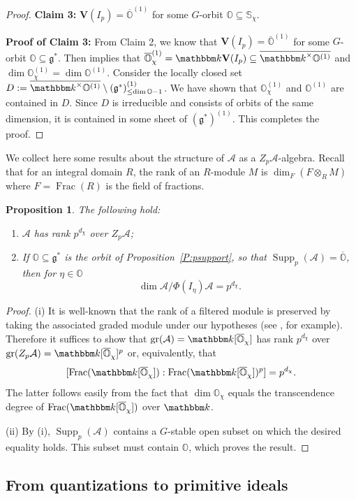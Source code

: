 \documentclass[twoside,12pt,reqno]{amsart}
\newtheorem{Proposition}[Theorem]{Proposition}
\theoremstyle{remark}
\numberwithin{equation}{section}
\def\k{{\mathbbm k}}
\def\gr{\operatorname{gr}}
\def\Fract{\operatorname{Frac}}
\def\Supp{\operatorname{Supp}}
\def\o{\overline}
\def\O{{\mathbb O}}
\def\bbS{\mathbb{S}}
\def\bbV{\mathbf{V}}
\def\g{{\mathfrak g}}
\def\cA{\mathcal{A}}
\newcommand{\A}{\mathcal{A}}
\begin{document}
\begin{proof}
{\bf Claim 3:} $\bbV(I_p)=\o\O^{(1)}$ for some $G$-orbit $\O\subseteq \bbS_\chi$.

{\bf Proof of Claim 3:} From Claim 2, we know that $\bbV(I_p)=\o\O^{(1)}$ for some $G$-orbit $\O\subseteq \g^*$. 
Then \cite[5.3(5)]{PrST} implies that $\o\O_\chi^{(1)}=\k \bbV(I_p)\subseteq \overline{\k^\times\O^{(1)}}$ and $\dim \O_\chi^{(1)} = \dim \O^{(1)}$. Consider the locally closed set $D := \overline{\k^\times \O^{(1)}} \setminus (\g^*)^{(1)}_{\le \dim \O-1}$. 
We have shown that $\O_\chi^{(1)}$ and $\O^{(1)}$ are contained in $D$. Since $D$ is irreducible and consists of orbits of the same dimension, it is contained in some sheet of $(\g^*)^{(1)}$. This completes the proof.
\end{proof}

We collect here some results about the structure of $\cA$ as a $Z_p\A$-algebra. Recall that for an integral domain $R$, the rank of an $R$-module $M$ is $\dim_{F}(F\otimes_R M)$ where $F = \Fract(R)$ is the field of fractions.

\begin{Proposition}
\label{P:fibredimension}
The following hold:
\begin{enumerate}
    \setlength{\itemsep}{4pt}
    \item[(i)] $\A$ has rank $p^{d_\chi}$ over $Z_p\A$;
    \item[(ii)] If $\O \subseteq \g^*$ is the orbit of Proposition~\ref{P:psupport}, so that $\Supp_p(\A) = \o\O$, then for $\eta \in \O$ $$\dim \A/\Phi(I_\eta)\A = p^{d_\chi}.$$
\end{enumerate}
\end{Proposition}
\begin{proof}
    (i) It is well-known that the rank of a filtered module is preserved by taking the associated graded module under our hypotheses (see \cite[Lemma 2.3]{Ti}, for example). Therefore it suffices to show that $\gr(\A)=\k[\o\O_\chi]$ has rank $p^{d_\chi}$ over $\gr(Z_p\A)=\k[\o\O_\chi]^p$ or, equivalently, that $$[\Fract(\k[\o\O_\chi]):\Fract(\k[\o\O_\chi])^p]=p^{d_\chi}.$$ The latter follows easily from the fact that $\dim\O_\chi$ equals the transcendence degree of $\Fract(\k[\o\O_\chi])$ over $\k$.    
    
    (ii) By (i), $\Supp_p(\A)$ contains a $G$-stable open subset on which the desired equality holds. This subset must contain $\O$, which proves the result.
\end{proof}

    
\subsection{From quantizations to primitive ideals}
\label{ss:quantisationtoprimitiveideals}
\end{document}

